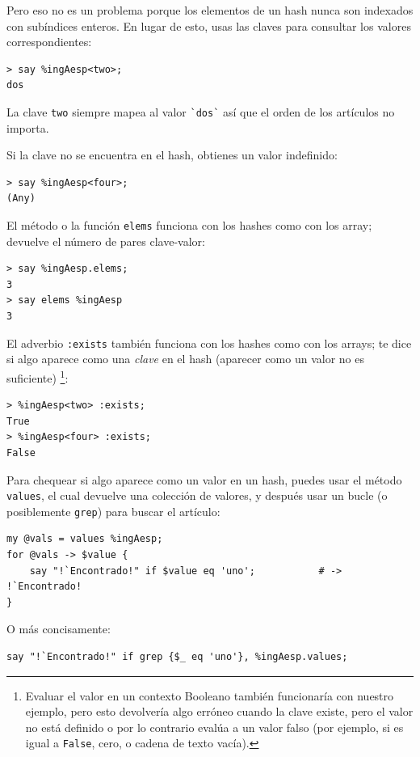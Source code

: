 Pero eso no es un problema porque los elementos de un hash
nunca son indexados con subíndices enteros. En lugar de esto,
usas las claves para consultar los valores correspondientes:

\begin{lstlisting}
> say %ingAesp<two>;
dos
\end{lstlisting}
%
La clave \verb"two" siempre mapea al valor \verb|`dos`|
así que el orden de los artículos no importa.

Si la clave no se encuentra en el hash, obtienes un valor 
indefinido:

\begin{lstlisting}
> say %ingAesp<four>;
(Any)
\end{lstlisting}
%
El método o la función {\tt elems} funciona con los hashes
como con los array; devuelve el número de pares clave-valor:


\begin{lstlisting}
> say %ingAesp.elems;
3
> say elems %ingAesp
3
\end{lstlisting}
%
El adverbio {\tt :exists} también funciona con los hashes 
como con los arrays; te dice si algo aparece como una 
{\em clave} en el hash (aparecer como un valor no es suficiente)
\footnote{Evaluar el valor en un contexto Booleano también 
funcionaría con nuestro ejemplo, pero esto devolvería
algo erróneo cuando la clave existe, pero el valor 
no está definido o por lo contrario evalúa a un valor falso
(por ejemplo, si es igual a {\tt False}, cero, o 
cadena de texto vacía).}:

\begin{lstlisting}
> %ingAesp<two> :exists;
True
> %ingAesp<four> :exists;
False
\end{lstlisting}
%
Para chequear si algo aparece como un valor en un hash, 
puedes usar el método {\tt values}, el cual devuelve una 
colección de valores, y después usar un bucle (o posiblemente 
{\tt grep}) para buscar el artículo:

\begin{lstlisting}
my @vals = values %ingAesp;
for @vals -> $value {
    say "!`Encontrado!" if $value eq 'uno';           # -> !`Encontrado!
}
\end{lstlisting}
%
O más concisamente:
\begin{lstlisting}
say "!`Encontrado!" if grep {$_ eq 'uno'}, %ingAesp.values;
\end{lstlisting}

